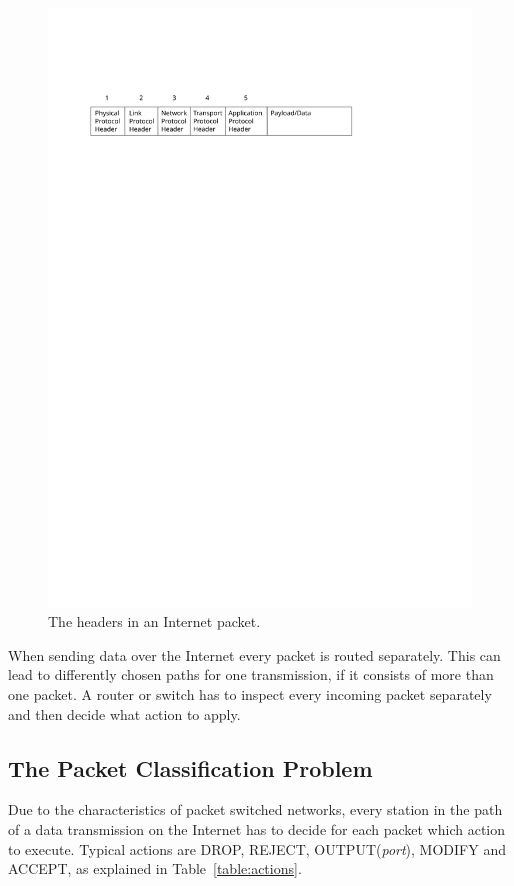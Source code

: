 \documentclass[a4paper,
		12pt,
		parskip=full,
		titlepage
		]{scrartcl}
\begin{document}
\begin{figure}
\centering
\includegraphics[width=\textwidth]{images/packet-headers}
\caption{The headers in an Internet packet.}
\label{fig:packet-headers}
\end{figure}

When sending data over the Internet every packet is routed separately.
This can lead to differently chosen paths for one transmission, if it consists of more than one packet.
A router or switch has to inspect every incoming packet separately and then decide what action to apply.

\subsection{The Packet Classification Problem}
Due to the characteristics of packet switched networks, every station in the path of a data transmission on the Internet 
has to decide for each packet which action to execute.
Typical actions are DROP, REJECT, OUTPUT(\textit{port}), MODIFY and ACCEPT, as explained in Table~\ref{table:actions}.
\end{document}

